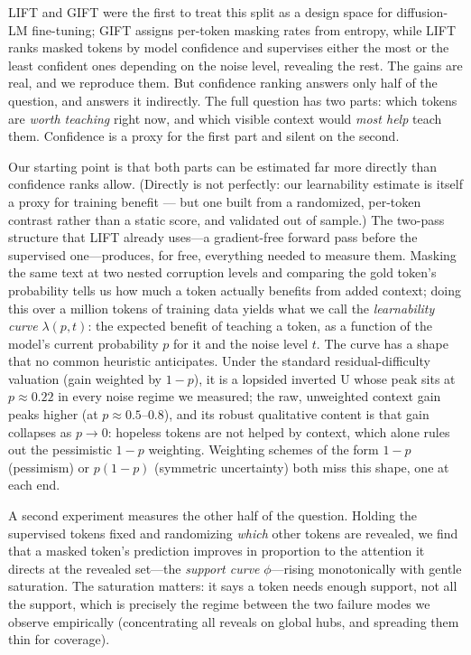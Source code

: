 \documentclass{article} %
\begin{document}
LIFT \citep{lift2026} and GIFT \citep{gift2025} were the first to treat this split as a design space for diffusion-LM fine-tuning; GIFT assigns per-token masking rates from entropy, while LIFT ranks masked tokens by model confidence and supervises either the most or the least confident ones depending on the noise level, revealing the rest. The gains are real, and we reproduce them. But confidence ranking answers only half of the question, and answers it indirectly. The full question has two parts: which tokens are \emph{worth teaching} right now, and which visible context would \emph{most help} teach them. Confidence is a proxy for the first part and silent on the second.

Our starting point is that both parts can be estimated far more directly than confidence ranks allow. (Directly is not perfectly: our learnability estimate is itself a proxy for training benefit --- but one built from a randomized, per-token contrast rather than a static score, and validated out of sample.) The two-pass structure that LIFT already uses---a gradient-free forward pass before the supervised one---produces, for free, everything needed to measure them. Masking the same text at two nested corruption levels and comparing the gold token's probability tells us how much a token actually benefits from added context; doing this over a million tokens of training data yields what we call the \emph{learnability curve} $\lambda(p, t)$: the expected benefit of teaching a token, as a function of the model's current probability $p$ for it and the noise level $t$. The curve has a shape that no common heuristic anticipates. Under the standard residual-difficulty valuation (gain weighted by $1-p$), it is a lopsided inverted U whose peak sits at $p \approx 0.22$ in every noise regime we measured; the raw, unweighted context gain peaks higher (at $p \approx 0.5$--$0.8$), and its robust qualitative content is that gain collapses as $p \to 0$: hopeless tokens are not helped by context, which alone rules out the pessimistic $1-p$ weighting. Weighting schemes of the form $1-p$ (pessimism) or $p(1-p)$ (symmetric uncertainty) both miss this shape, one at each end.

A second experiment measures the other half of the question. Holding the supervised tokens fixed and randomizing \emph{which} other tokens are revealed, we find that a masked token's prediction improves in proportion to the attention it directs at the revealed set---the \emph{support curve} $\phi$---rising monotonically with gentle saturation. The saturation matters: it says a token needs enough support, not all the support, which is precisely the regime between the two failure modes we observe empirically (concentrating all reveals on global hubs, and spreading them thin for coverage).
\end{document}
